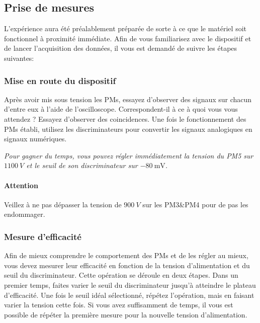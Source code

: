 \subsection{Prise de mesures}
L'expérience aura été préalablement préparée de sorte à ce que le matériel soit fonctionnel à proximité immédiate.
Afin de vous familiarisez avec le dispositif et de lancer l'acquisition des données, il vous est demandé de suivre les étapes suivantes:

\begin{center}
\end{center}

\subsubsection{Mise en route du dispositif}

Après avoir mis sous tension les PMs, essayez d'observer des signaux sur chacun d'entre eux à l'aide de l'oscilloscope.
Correspondent-il à ce à quoi vous vous attendez ?
Essayez d'observer des coincidences.
Une fois le fonctionnement des PMs établi, utilisez les discriminateurs pour convertir les signaux analogiques en signaux numériques.

\textit{Pour gagner du temps, vous pouvez régler immédiatement la tension du PM5 sur \(\SI{1100}{V}\) et le seuil de son discriminateur sur \(\SI{-80}{\mV}\).}

\paragraph{Attention} Veillez à ne pas dépasser la tension de \(\SI{900}{V}\) sur les PM3\&PM4 pour de pas les endommager.

\subsubsection{Mesure d'efficacité}
Afin de mieux comprendre le comportement des PMs et de les régler au mieux, vous devez mesurer leur efficacité en fonction de la tension d'alimentation et du seuil du discriminateur.
Cette opération se déroule en deux étapes.
Dans un premier temps, faites varier le seuil du discriminateur jusqu'à atteindre le plateau d'efficacité.
Une fois le seuil idéal sélectionné, répétez l'opération, mais en faisant varier la tension cette fois.
Si vous avez suffisamment de temps, il vous est possible de répéter la première mesure pour la nouvelle tension d'alimentation.


